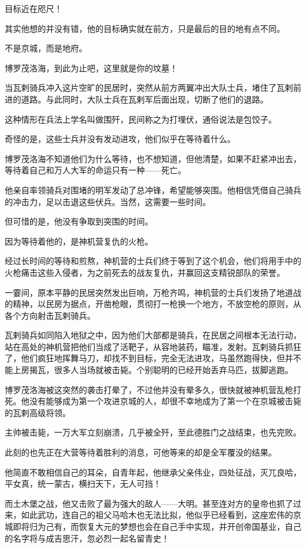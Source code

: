 \begin{multicols}{\theparacolNo}
目标近在咫尺！

其实他想的并没有错，他的目标确实就在前方，只是最后的目的地有点不同。

不是京城，而是地府。

博罗茂洛海，到此为止吧，这里就是你的坟墓！

当瓦剌骑兵冲入这片空旷的民居时，突然从前方两翼冲出大队士兵，堵住了瓦剌前进的道路。与此同时，大队士兵在瓦剌军后面出现，切断了他们的退路。

这种情形在兵法上学名叫做围歼，民间称之为打埋伏，通俗说法是包饺子。

奇怪的是，这些士兵并没有发动进攻，他们似乎在等待着什么。

博罗茂洛海不知道他们为什么等待，也不想知道，但他清楚，如果不赶紧冲出去，等待着自己和万人大军的命运只有一种——死亡。

他亲自率领骑兵对围堵的明军发动了总冲锋，希望能够突围。他相信凭借自己骑兵的冲击力，足以击退这些伏兵。当然，这需要一些时间。

但可惜的是，他没有争取到突围的时间。

因为等待着他的，是神机营复仇的火枪。

经过长时间的等待和煎熬，神机营的士兵们终于等到了这个机会，他们将用手中的火枪痛击这些入侵者，为之前死去的战友复仇，并赢回这支精锐部队的荣誉。

一霎间，原本平静的民居突然发出巨响，万枪齐鸣，神机营的士兵们发扬了地道战的精神，以民房为据点，开凿枪眼，贯彻打一枪换一个地方，不放空枪的原则，从各个方向射击瓦剌骑兵。

瓦剌骑兵如同陷入地狱之中，因为他们大部都是骑兵，在民居之间根本无法行动，站在高处的神机营把他们当成了活靶子，从容地装药，瞄准，发射。瓦剌骑兵抓狂了，他们疯狂地挥舞马刀，却找不到目标，完全无法进攻，马虽然跑得快，但并不能上房揭瓦，很多人当场就被击毙。个别聪明的已经开始丢弃马匹，拔脚逃跑。

博罗茂洛海被这突然的袭击打晕了，不过他并没有晕多久，很快就被神机营乱枪打死。他没有能够成为第一个攻进京城的人，却很不幸地成为了第一个在京城被击毙的瓦剌高级将领。

主帅被击毙，一万大军立刻崩溃，几乎被全歼，至此德胜门之战结束，也先完败。

此刻的也先正在大营等待着胜利的消息，可他等来的却是全军覆没的结果。

他简直不敢相信自己的耳朵，自青年起，他继承父亲伟业，四处征战，灭兀良哈，平女真，统一蒙古，横扫天下，无人可挡！

而土木堡之战，他又击败了最为强大的敌人——大明。甚至连对方的皇帝也抓了过来，如此武功，连自己的祖父马哈木也无法比拟，他似乎已经看到，这座宏伟的京城即将归为己有，而恢复大元的梦想也会在自己手中实现，并开创帝国基业，自己的名字将与成吉思汗，忽必烈一起名留青史！


\end{multicols}
